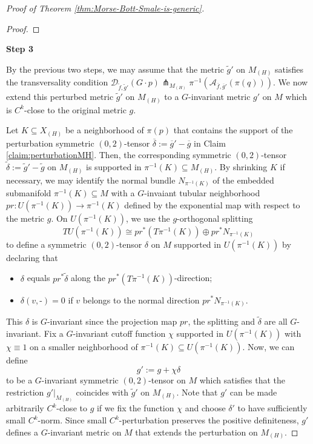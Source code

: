 \documentclass[11pt]{amsart}
\theoremstyle{definition}
\numberwithin{equation}{subsection}
\newcommand{\des}{\mathscr{D}}
\newcommand{\asc}{\mathscr{A}}
\begin{document}
\begin{proof}[Proof of Theorem \ref{thm:Morse-Bott-Smale-is-generic}]
\begin{proof}
\end{proof}
 
\medskip
 \noindent\textbf{Step 3}

By the previous two steps, we may assume that the metric $\tilde{g}'$ on $M_{(H)}$ satisfies the transversality condition $\des_{\tilde{f},\tilde{g}'}(G\cdot p)\pitchfork_{M_{(H)}}\pi^{-1}(\asc_{\overline{f},\overline{g}'}(\pi(q)))$. We now extend this perturbed metric $\tilde{g}'$ on $M_{(H)}$ to a $G$-invariant metric $g'$ on $M$ which is $C^k$-close to the original metric $g$.

Let $K\subseteq X_{(H)}$ be a neighborhood of $\pi(p)$ that contains the support of the perturbation symmetric $(0,2)$-tensor $\overline{\delta}:=\overline{g}'-\overline{g}$ in Claim \ref{claim:perturbationMH}. Then, the corresponding symmetric $(0,2)$-tensor $\tilde{\delta}:=\tilde{g}'-\tilde{g}$ on $M_{(H)}$ is supported in $\pi^{-1}(K)\subseteq M_{(H)}$. By shrinking $K$ if necessary, we may identify the normal bundle $N_{\pi^{-1}(K)}$ of the embedded submanifold $\pi^{-1}(K)\subseteq M$ with a $G$-invaiant tubular neighborhood $pr:U(\pi^{-1}(K))\rightarrow \pi^{-1}(K)$ defined by the exponential map with respect to the metric $g$. On $U(\pi^{-1}(K))$, we use the $g$-orthogonal splitting \[TU(\pi^{-1}(K))\cong pr^*(T\pi^{-1}(K))\oplus pr^*N_{\pi^{-1}(K)}\] to define a symmetric $(0,2)$-tensor $\delta$ on $M$ supported in $U(\pi^{-1}(K))$ by declaring that 
\begin{itemize}
    \item $\delta$ equals $pr^*\tilde{\delta}$ along the $pr^*(T\pi^{-1}(K))$-direction;
    \item $\delta(v,\textrm{-})=0$ if $v$ belongs to the normal direction $pr^*N_{\pi^{-1}(K)}$.  
\end{itemize}
This $\delta$ is $G$-invariant since the projection map $pr$, the splitting and $\tilde{\delta}$ are all $G$-invariant. Fix a $G$-invariant cutoff function $\chi$ supported in $U(\pi^{-1}(K))$ with $\chi\equiv 1$ on a smaller neighborhood of $\pi^{-1}(K)\subseteq U(\pi^{-1}(K))$. Now, we can define
\[g':=g+\chi \delta\] to be a $G$-invariant symmetric $(0,2)$-tensor on $M$ which satisfies that the restriction $g'|_{M_{(H)}}$ coincides with $\tilde{g}'$ on $M_{(H)}$. Note that $g'$ can be made arbitrarily $C^k$-close to $g$ if we fix the function $\chi$ and choose $\delta'$ to have sufficiently small $C^k$-norm. Since small $C^k$-perturbation preserves the positive definiteness, $g'$ defines a $G$-invariant metric on $M$ that extends the perturbation on $M_{(H)}$. 


\end{proof}
\end{document}
